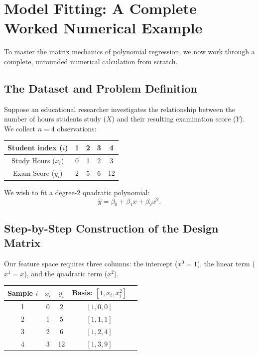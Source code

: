 \documentclass[11pt,a4paper]{article}
\numberwithin{equation}{section}
\begin{document}
\section{Model Fitting: A Complete Worked Numerical Example}

To master the matrix mechanics of polynomial regression, we now work through a complete, unrounded numerical calculation from scratch.

\subsection{The Dataset and Problem Definition}
Suppose an educational researcher investigates the relationship between the number of hours students study ($X$) and their resulting examination score ($Y$). We collect $n=4$ observations:

\begin{center}
\begin{tabular}{ccccc}
\toprule
Student index ($i$) & 1 & 2 & 3 & 4 \\
\midrule
Study Hours ($x_i$) & 0 & 1 & 2 & 3 \\
Exam Score ($y_i$)  & 2 & 5 & 6 & 12 \\
\bottomrule
\end{tabular}
\end{center}

We wish to fit a degree-2 quadratic polynomial:
\begin{equation}
  \hat{y} = \beta_0 + \beta_1 x + \beta_2 x^2.
\end{equation}

\subsection{Step-by-Step Construction of the Design Matrix}
Our feature space requires three columns: the intercept ($x^0 = 1$), the linear term ($x^1 = x$), and the quadratic term ($x^2$).

\begin{center}
\begin{tabular}{ccccc}
\toprule
Sample $i$ & $x_i$ & $y_i$ & Basis: $[1, x_i, x_i^2]$ \\
\midrule
1 & 0 & 2  & $[1, 0, 0]$ \\
2 & 1 & 5  & $[1, 1, 1]$ \\
3 & 2 & 6  & $[1, 2, 4]$ \\
4 & 3 & 12 & $[1, 3, 9]$ \\
\bottomrule
\end{tabular}
\end{center}
\end{document}
